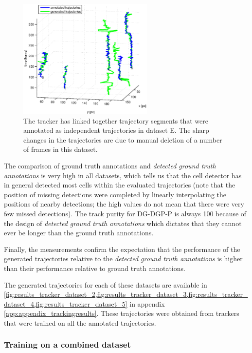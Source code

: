 		\begin{figure}[h]
			\centering				\includegraphics[width=0.6\textwidth]{images/fig_results_tracking_analysis_4}
			\caption{The tracker has linked together trajectory segments that were annotated as independent trajectories in dataset E. The sharp changes in the trajectories are due to manual deletion of a number of frames in this dataset.}
			\label{fig:results_tracking_analysisD}
		\end{figure}
		
		The comparison of ground truth annotations and \textit{detected ground truth annotations} is very high in all datasets, which tells us that the cell detector has in general detected most cells within the evaluated trajectories (note that the position of missing detections were completed by linearly interpolating the positions of nearby detections; the high values do not mean that there were very few missed detections). The track purity for DG-DGP-P is always 100 because of the design of \textit{detected ground truth annotations} which dictates that they cannot ever be longer than the ground truth annotations.
		
		Finally, the measurements confirm the expectation that the performance of the generated trajectories relative to the \textit{detected ground truth annotations} is higher than their performance relative to ground truth annotations.
		
		The generated trajectories for each of these datasets are available in \cref{fig:results_tracker_dataset_2,fig:results_tracker_dataset_3,fig:results_tracker_dataset_4,fig:results_tracker_dataset_5} in appendix \ref{app:appendix_trackingresults}. These trajectories were obtained from trackers that were trained on all the annotated trajectories.
		
		\subsubsection{Training on a combined dataset}
		
